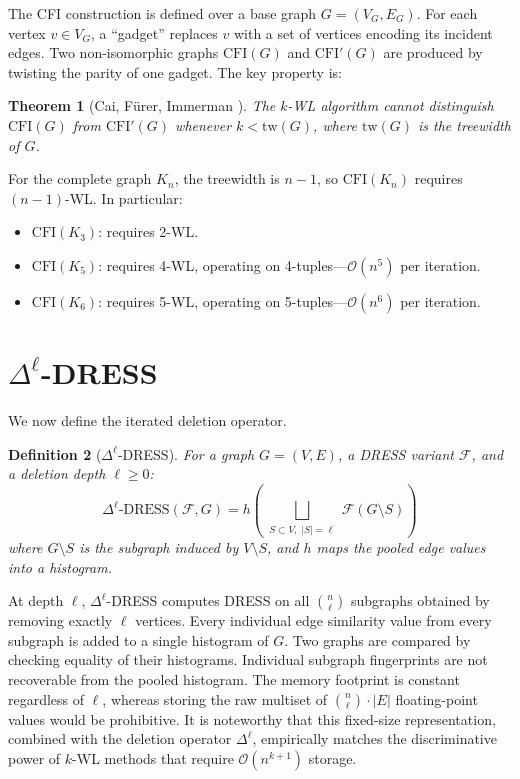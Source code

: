 \documentclass[11pt,a4paper]{article}
\newtheorem{theorem}{Theorem}
\newtheorem{definition}[theorem]{Definition}
\begin{document}
The CFI construction \cite{cai1992optimal} is defined over a base graph $G = (V_G, E_G)$. For each vertex $v \in V_G$, a ``gadget'' replaces $v$ with a set of vertices encoding its incident edges. Two non-isomorphic graphs $\text{CFI}(G)$ and $\text{CFI}'(G)$ are produced by twisting the parity of one gadget. The key property is:

\begin{theorem}[Cai, F\"urer, Immerman \cite{cai1992optimal}]
The $k$-WL algorithm cannot distinguish $\text{CFI}(G)$ from $\text{CFI}'(G)$ whenever $k < \text{tw}(G)$, where $\text{tw}(G)$ is the treewidth of $G$.
\end{theorem}

For the complete graph $K_n$, the treewidth is $n - 1$, so $\text{CFI}(K_n)$ requires $(n{-}1)$-WL. In particular:
\begin{itemize}
    \item $\text{CFI}(K_3)$: requires 2-WL.
    \item $\text{CFI}(K_5)$: requires 4-WL, operating on 4-tuples---$\mathcal{O}(n^5)$ per iteration.
    \item $\text{CFI}(K_6)$: requires 5-WL, operating on 5-tuples---$\mathcal{O}(n^6)$ per iteration.
\end{itemize}

\section{\texorpdfstring{$\Delta^\ell$}{Delta-ell}-DRESS}

We now define the iterated deletion operator.

\begin{definition}[$\Delta^\ell$-DRESS]
For a graph $G = (V, E)$, a DRESS variant $\mathcal{F}$, and a deletion depth $\ell \ge 0$:
\[
\Delta^\ell\text{-DRESS}(\mathcal{F}, G) = h\!\left(\bigsqcup_{\substack{S \subset V,\; |S|=\ell}} \mathcal{F}(G \setminus S)\right)
\]
where $G \setminus S$ is the subgraph induced by $V \setminus S$, and $h$ maps the pooled edge values into a histogram.
\end{definition}

At depth $\ell$, $\Delta^\ell$-DRESS computes DRESS on all $\binom{n}{\ell}$ subgraphs obtained by removing exactly $\ell$ vertices. Every individual edge similarity value from every subgraph is added to a single histogram of $G$. Two graphs are compared by checking equality of their histograms. Individual subgraph fingerprints are not recoverable from the pooled histogram. The memory footprint is constant regardless of $\ell$, whereas storing the raw multiset of $\binom{n}{\ell} \cdot |E|$ floating-point values would be prohibitive. It is noteworthy that this fixed-size representation, combined with the deletion operator $\Delta^\ell$, empirically matches the discriminative power of $k$-WL methods that require $\mathcal{O}(n^{k+1})$ storage.
\end{document}
